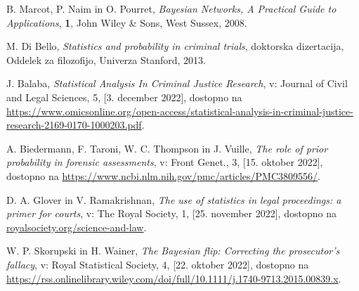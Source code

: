\documentclass{beamer}
\begin{document}
\begin{frame}
    \begin{thebibliography}{99}
        B. Marcot, P. Naim in O. Pourret, \emph{Bayesian Networks, A Practical Guide to Applications}, \textbf{1}, John Wiley \& Sons, West Sussex, 2008.

        M. Di Bello, \emph{Statistics and probability in criminal trials}, doktorska dizertacija, Oddelek za filozofijo, Univerza Stanford, 2013.

        J. Balaba, \emph{Statistical Analysis In Criminal Justice Research}, v: Journal of Civil and Legal Sciences, 5, [3. december 2022], dostopno na \url{https://www.omicsonline.org/open-access/statistical-analysis-in-criminal-justice-research-2169-0170-1000203.pdf}.

        A. Biedermann, F. Taroni, W. C. Thompson in J. Vuille, \emph{The role of prior probability in forensic assessments}, v: Front Genet., 3, [15. oktober 2022], dostopno na \url{https://www.ncbi.nlm.nih.gov/pmc/articles/PMC3809556/}.
    \end{thebibliography}
\end{frame}

\begin{frame}
    \begin{thebibliography}{99}
    D. A. Glover in V. Ramakrishnan, \emph{The use of statistics in legal proceedings: a primer for courts}, v: The Royal Society, 1, [25. november 2022], dostopno na \url{royalsociety.org/science-and-law}.

    W. P. Skorupski in H. Wainer, \emph{The Bayesian flip: Correcting the prosecutor's fallacy}, v: Royal Statistical Society, 4, [22. oktober 2022], dostopno na \url{https://rss.onlinelibrary.wiley.com/doi/full/10.1111/j.1740-9713.2015.00839.x}.
    \end{thebibliography}
\end{frame}
\end{document}
